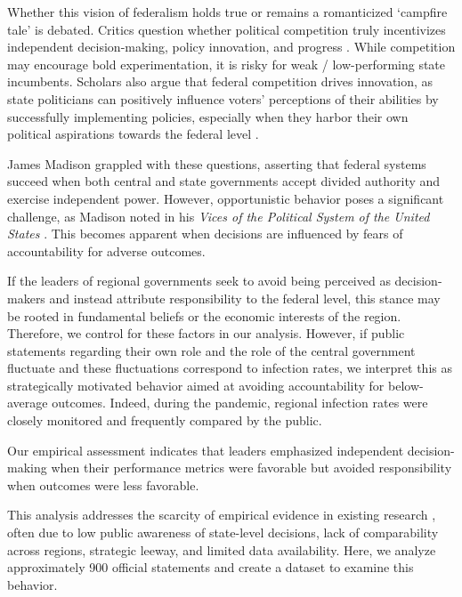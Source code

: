 \documentclass[12pt, abstract=true]{scrartcl}
\begin{document}
Whether this vision of federalism holds true or remains a romanticized `campfire tale' \citep{Tyler2022} is debated. Critics question whether political competition truly incentivizes independent decision-making, policy innovation, and progress \citep{RoseAckerman1980, Weaver1986, Strumpf2002}. While competition may encourage bold experimentation, it is risky for weak / low-performing state incumbents. Scholars also argue that federal competition drives innovation, as state politicians can positively influence voters' perceptions of their abilities by successfully implementing policies, especially when they harbor their own political aspirations towards the federal level \citep{KotSchwager2006}.

James Madison grappled with these questions, asserting that federal systems succeed when both central and state governments accept divided authority and exercise independent power. However, opportunistic behavior poses a significant challenge, as Madison noted in his \textit{Vices of the Political System of the United States} \citep{Madison1787}. This becomes apparent when decisions are influenced by fears of accountability for adverse outcomes.

If the leaders of regional governments seek to avoid being perceived as decision-makers and instead attribute responsibility to the federal level, this stance may be rooted in fundamental beliefs or the economic interests of the region. Therefore, we control for these factors in our analysis. However, if public statements regarding their own role and the role of the central government fluctuate and these fluctuations correspond to infection rates, we interpret this as strategically motivated behavior aimed at avoiding accountability for below-average outcomes. Indeed, during the pandemic, regional infection rates were closely monitored and frequently compared by the public. 

Our empirical assessment indicates that leaders emphasized independent decision-making when their performance metrics were favorable but avoided responsibility when outcomes were less favorable.

This analysis addresses the scarcity of empirical evidence in existing research \citep{Agrawal2022}, often due to low public awareness of state-level decisions, lack of comparability across regions, strategic leeway, and limited data availability. Here, we analyze approximately 900 official statements and create a dataset to examine this behavior.
\end{document}
